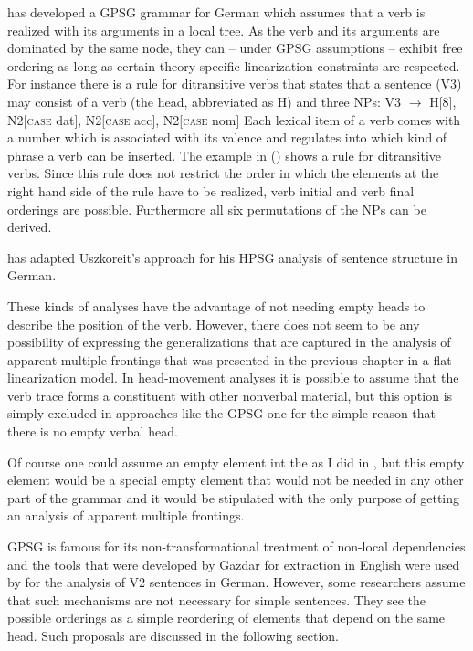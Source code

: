 \citet{Uszkoreit87a} has developed a GPSG grammar for German which assumes that a verb is realized with
its arguments in a local tree. As the verb and its arguments are dominated by the same node, they can -- under
GPSG assumptions -- exhibit free ordering as long as certain theory-specific linearization
constraints are respected. For instance there is a rule for ditransitive verbs that states that a
sentence (V3) may consist of a verb (the head, abbreviated as H) and three NPs:
\ea
V3 $\to$ H[8], N2[\textsc{case} dat], N2[\textsc{case} acc], N2[\textsc{case} nom] 
\z
Each lexical item of a verb comes with a number which is associated with its valence and regulates
into which kind of phrase a verb can be inserted. The example in () shows a rule for
ditransitive verbs. Since this rule does not restrict the order in which the elements at the right
hand side of the rule have to be realized, verb initial and verb final orderings are
possible. Furthermore all six permutations of the NPs can be derived.

\citet{Pollard90a} has adapted Uszkoreit's approach for his HPSG analysis of sentence structure in
German.

These kinds of analyses have the advantage of not needing empty heads to describe the position
of the verb. However, there does not seem to be any possibility of expressing the generalizations that are captured
in the analysis of apparent multiple frontings that was presented in the previous chapter in a flat
linearization model. In head-movement analyses it is possible to assume that the verb trace forms a
constituent with other nonverbal material, but this option is simply excluded in approaches like the
GPSG one for the simple reason that there is no empty verbal head.

Of course one could assume an empty element int the \vf as I did in
, but this empty element would be a special empty
element that would not be needed in any other part of the grammar and it would be stipulated with
the only purpose of getting an analysis of apparent multiple frontings.

GPSG is famous for its non-transformational treatment of non-local dependencies \citep{Gazdar81}
and the tools that were developed by Gazdar for extraction in English were used by
\citet{Uszkoreit87a} for the analysis of V2 sentences in German. However, some researchers assume
that such mechanisms are not necessary for simple sentences. They see the possible orderings as a
simple reordering of elements that depend on the same head. Such proposals are discussed in the
following section. 


